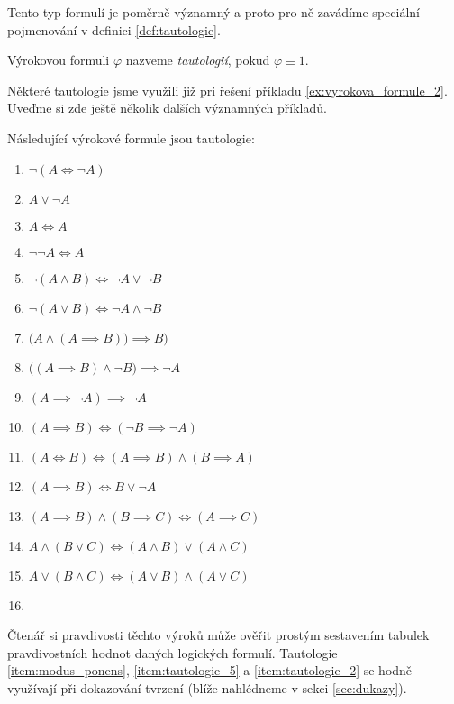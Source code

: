 Tento typ formulí je poměrně významný a proto pro ně zavádíme speciální pojmenování v definici \ref{def:tautologie}.
\begin{definition}[Tautologie]\label{def:tautologie}
    Výrokovou formuli $\varphi$ nazveme \emph{tautologií}, pokud $\varphi\equiv 1$.
\end{definition}

Některé tautologie jsme využili již pri řešení příkladu \ref{ex:vyrokova_formule_2}. Uveďme si zde ještě několik dalších významných příkladů.
\begin{theorem}\label{thm:vyznamne_tautologie}
    Následující výrokové formule jsou tautologie:
    \begin{enumerate}[label=(\roman*)]
        \item\label{item:tautologie_1} $\neg (A \iff \neg A)$
        \item\label{item:zakon_vylouceneho_tretiho} $A \lor \neg A$ 
        \item\label{item:zakon_identity} $A \iff A$ 
        \item\label{item:zakon_dvoji_negace} $\neg\neg A \iff A$ 
        \item\label{item:de_morgan_1} $\neg (A \land B) \iff \neg A \lor \neg B$ 
        \item\label{item:de_morgan_2} $\neg (A \lor B) \iff \neg A \land \neg B$ 
        \item\label{item:modus_ponens} $\big(A \land (A \implies B)\big) \implies B)$ 
        \item\label{item:modus_tollens_1} $\big((A \implies B) \land \neg B\big) \implies \neg A$ 
        \item\label{item:reductio_ad_absurdum} $(A \implies \neg A) \implies \neg A$
        \item\label{item:tautologie_5} $(A \implies B) \iff (\neg B \implies \neg A)$
        \item\label{item:tautologie_2} $(A \iff B) \iff (A \implies B) \land (B \implies A)$
        \item\label{item:tautologie_3} $(A \implies B) \iff B \lor \neg A$
        \item\label{item:tautologie_4} $(A \implies B) \land (B \implies C) \iff (A \implies C)$
        \item\label{item:tautologie_6} $A \land (B \lor C) \iff (A \land B) \lor (A \land C)$
        \item\label{item:tautologie_7} $A \lor (B \land C) \iff (A \lor B) \land (A \lor C)$
        \item\label{item:tautologie_8}
    \end{enumerate}
\end{theorem}

Čtenář si pravdivosti těchto výroků může ověřit prostým sestavením tabulek pravdivostních hodnot daných logických formulí. Tautologie \ref{item:modus_ponens}, \ref{item:tautologie_5} a \ref{item:tautologie_2} se hodně využívají při dokazování tvrzení (blíže nahlédneme v sekci \ref{sec:dukazy}).